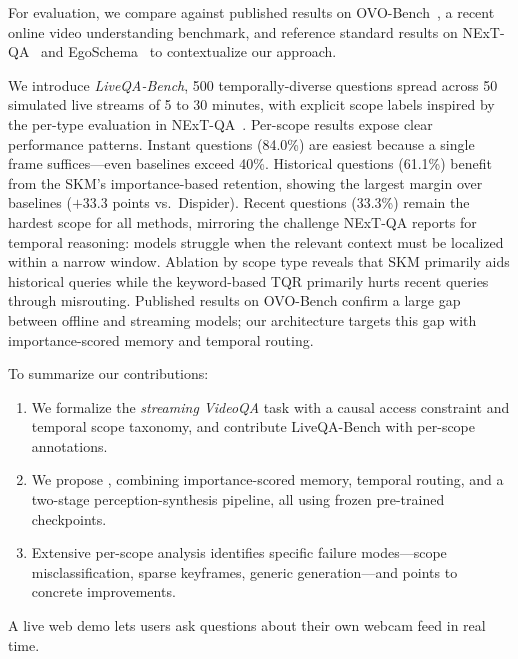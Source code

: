 For evaluation, we compare against published results on OVO-Bench~\cite{li2025ovobench}, a recent online video understanding benchmark, and reference standard results on NExT-QA~\cite{xiao2021nextqa} and EgoSchema~\cite{mangalam2023egoschema} to contextualize our approach.

We introduce \emph{LiveQA-Bench}, 500 temporally-diverse questions spread across 50 simulated live streams of 5 to 30 minutes, with explicit scope labels inspired by the per-type evaluation in NExT-QA~\cite{xiao2021nextqa}.
Per-scope results expose clear performance patterns.
Instant questions (84.0\%) are easiest because a single frame suffices---even baselines exceed 40\%.
Historical questions (61.1\%) benefit from the SKM's importance-based retention, showing the largest margin over baselines ($+$33.3 points vs.\ Dispider).
Recent questions (33.3\%) remain the hardest scope for all methods, mirroring the challenge NExT-QA reports for temporal reasoning: models struggle when the relevant context must be localized within a narrow window.
Ablation by scope type reveals that SKM primarily aids historical queries while the keyword-based TQR primarily hurts recent queries through misrouting.
Published results on OVO-Bench confirm a large gap between offline and streaming models; our architecture targets this gap with importance-scored memory and temporal routing.

To summarize our contributions:
\begin{enumerate}[leftmargin=*,itemsep=1pt]
  \item We formalize the \emph{streaming VideoQA} task with a causal access constraint and temporal scope taxonomy, and contribute LiveQA-Bench with per-scope annotations.
  \item We propose \ours, combining importance-scored memory, temporal routing, and a two-stage perception-synthesis pipeline, all using frozen pre-trained checkpoints.
  \item Extensive per-scope analysis identifies specific failure modes---scope misclassification, sparse keyframes, generic generation---and points to concrete improvements.
\end{enumerate}

A live web demo lets users ask questions about their own webcam feed in real time.
